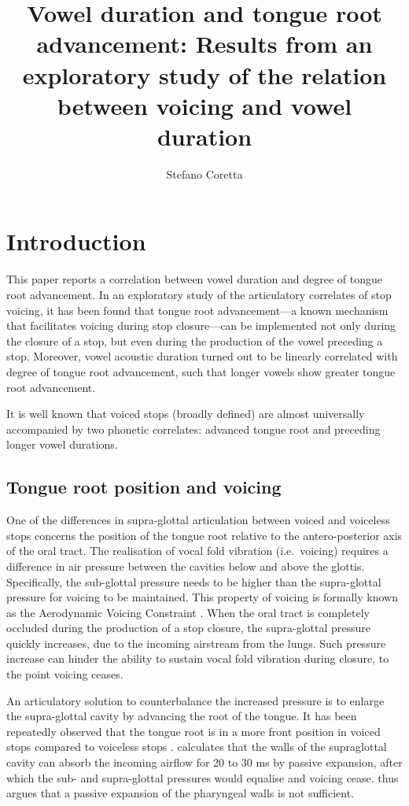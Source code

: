 \documentclass[12pt,]{article}
\title{Vowel duration and tongue root advancement: Results from an exploratory
study of the relation between voicing and vowel duration}
\author{Stefano Coretta}
\date{}
\begin{document}
\maketitle

\hypertarget{introduction}{%
\section{Introduction}\label{introduction}}

This paper reports a correlation between vowel duration and degree of
tongue root advancement. In an exploratory study of the articulatory
correlates of stop voicing, it has been found that tongue root
advancement---a known mechanism that facilitates voicing during stop
closure---can be implemented not only during the closure of a stop, but
even during the production of the vowel preceding a stop. Moreover,
vowel acoustic duration turned out to be linearly correlated with degree
of tongue root advancement, such that longer vowels show greater tongue
root advancement.

It is well known that voiced stops (broadly defined) are almost
universally accompanied by two phonetic correlates: advanced tongue root
and preceding longer vowel durations.

\hypertarget{tongue-root-position-and-voicing}{%
\subsection{Tongue root position and
voicing}\label{tongue-root-position-and-voicing}}

One of the differences in supra-glottal articulation between voiced and
voiceless stops concerns the position of the tongue root relative to the
antero-posterior axis of the oral tract. The realisation of vocal fold
vibration (i.e.~voicing) requires a difference in air pressure between
the cavities below and above the glottis. Specifically, the sub-glottal
pressure needs to be higher than the supra-glottal pressure for voicing
to be maintained. This property of voicing is formally known as the
Aerodynamic Voicing Constraint \citep{ohala2011}. When the oral tract is
completely occluded during the production of a stop closure, the
supra-glottal pressure quickly increases, due to the incoming airstream
from the lungs. Such pressure increase can hinder the ability to sustain
vocal fold vibration during closure, to the point voicing ceases.

An articulatory solution to counterbalance the increased pressure is to
enlarge the supra-glottal cavity by advancing the root of the tongue. It
has been repeatedly observed that the tongue root is in a more front
position in voiced stops compared to voiceless stops
\citep{kent1969, perkell1969, westbury1983}. \citet{rothenberg1967}
calculates that the walls of the supraglottal cavity can absorb the
incoming airflow for 20 to 30 ms by passive expansion, after which the
sub- and supra-glottal pressures would equalise and voicing cease.
\citet{rothenberg1967} thus argues that a passive expansion of the
pharyngeal walls is not sufficient.
\end{document}
